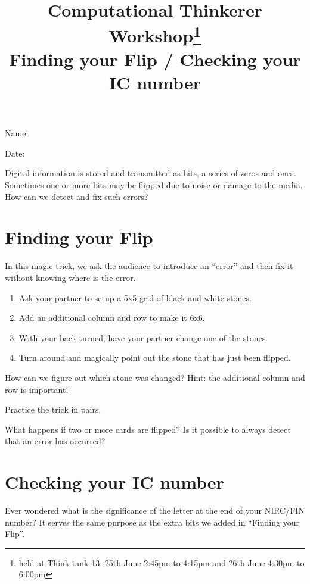 \documentclass[a4paper,12pt]{article}
\title{Computational Thinkerer Workshop\footnote{held at Think tank 13: 25th June 2:45pm to 4:15pm and 26th June 4:30pm to 6:00pm}\\
Finding your Flip / Checking your IC number
\vspace{-2cm}}
\date{}
\newcommand\Blank[2][.33\linewidth]{%
  \rule{0pt}{4ex}%
  #2\enspace
  \makebox[#1]{\hrulefill}}
\begin{document}
\maketitle
\begin{flushright}
  \Blank{Name:}

  \Blank{Date:}
\end{flushright}

Digital information is stored and transmitted as bits, a series of
zeros and ones. Sometimes one or more bits may be flipped due to noise or damage
to the media. How can we detect and fix such errors?

\section*{Finding your Flip}
In this magic trick, we ask the audience to introduce an ``error'' and then fix
it without knowing where is the error.
\begin{enumerate}
    \item Ask your partner to setup a 5x5 grid of black and white stones.
    \item Add an additional column and row to make it 6x6.
    \item With your back turned, have your partner change one of the stones.
    \item Turn around and magically point out the stone that has just been flipped.
\end{enumerate}

\begin{question}[skip-below=3\baselineskip]
How can we figure out which stone was changed? Hint: the additional
column and row is important!
\end{question}

\begin{question}[skip-below=3\baselineskip]
Practice the trick in pairs.
\end{question}

\begin{question}[skip-below=3\baselineskip]
What happens if two or more cards are flipped? Is it possible to always detect
that an error has occurred?
\end{question}


\newpage
\section*{Checking your IC number}
Ever wondered what is the significance of the letter at the end of your NIRC/FIN
number? It serves the same purpose as the extra bits we added in
``Finding your Flip''.
\end{document}
